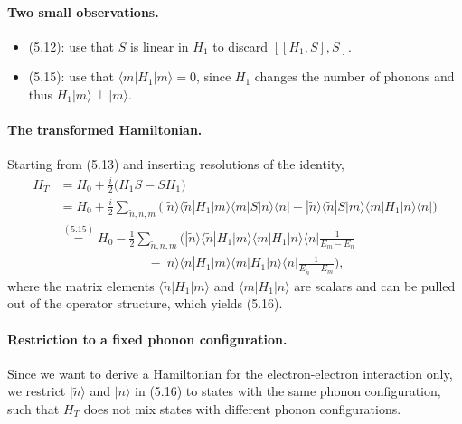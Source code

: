 \documentclass[../../main.tex]{subfiles}
\begin{document}
\paragraph{Two small observations.}
\begin{itemize}
\item (5.12): use that $S$ is linear in $H_1$ to discard $[[H_1,S],S]$.
\item (5.15): use that $\langle m|H_1|m\rangle=0$, since $H_1$ changes the number of
      phonons and thus $H_1|m\rangle\perp|m\rangle$.
\end{itemize}

\paragraph{The transformed Hamiltonian.}
Starting from (5.13) and inserting resolutions of the identity,
\begin{align}
H_T &= H_0+\frac{i}{2}\big(H_1S-SH_1\big)\\
&= H_0+\frac{i}{2}\sum_{\tilde n,n,m}\Big(
   |\tilde n\rangle\langle\tilde n|H_1|m\rangle\langle m|S|n\rangle\langle n|
 - |\tilde n\rangle\langle\tilde n|S|m\rangle\langle m|H_1|n\rangle\langle n|\Big)\\
&\overset{(5.15)}{=} H_0-\frac{1}{2}\sum_{\tilde n,n,m}\Big(
   |\tilde n\rangle\langle\tilde n|H_1|m\rangle\langle m|H_1|n\rangle\langle n|
   \frac{1}{E_m-E_n}\nonumber\\
&\hspace{7em}
 - |\tilde n\rangle\langle\tilde n|H_1|m\rangle\langle m|H_1|n\rangle\langle n|
   \frac{1}{E_{\tilde n}-E_m}\Big),
\end{align}
where the matrix elements $\langle\tilde n|H_1|m\rangle$ and $\langle m|H_1|n\rangle$ are
scalars and can be pulled out of the operator structure, which yields (5.16).

\paragraph{Restriction to a fixed phonon configuration.}
Since we want to derive a Hamiltonian for the electron-electron interaction only, we
restrict $|\tilde n\rangle$ and $|n\rangle$ in (5.16) to states with the same phonon
configuration, such that $H_T$ does not mix states with different phonon configurations.
\end{document}
